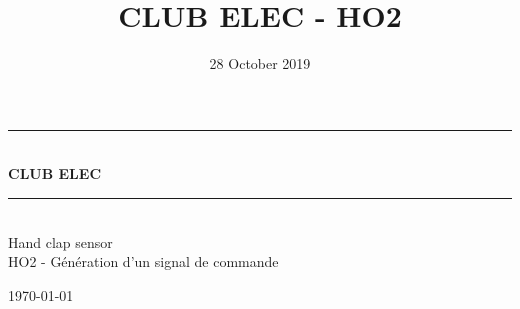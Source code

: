 \documentclass{article}
\title{CLUB ELEC - HO2}
\author{}
\date{28 October 2019}
\begin{document}
\begin{titlepage}
\begin{center}

\rule{\linewidth}{0.5mm} \\[0.4cm]
{ \huge \bfseries \textsc{CLUB ELEC}\\[0.4cm] }
\rule{\linewidth}{0.5mm} \\[2cm]

{\huge Hand clap sensor}\\[0.6cm]
{\large HO2 - Génération d'un signal de commande}\\[3cm]


\vspace{12cm}

{\large  \today}

\end{center}
\end{titlepage}









% 
% 
\end{document}
